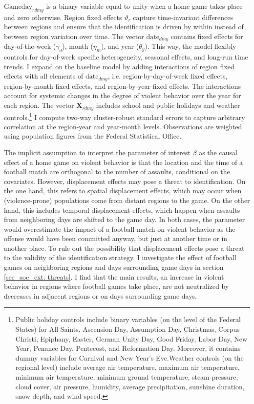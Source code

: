 $\text{Gameday}_{rdmy}$ is a binary variable equal to unity when a home game takes place and zero otherwise. Region fixed effects $\vartheta_r$ capture time-invariant differences between regions and ensure that the identification is driven by within instead of between region variation over time. The vector $\text{date}_{dmy}$ contains fixed effects for day-of-the-week ($\gamma_d$), month ($\eta_m$), and year ($\theta_y$). This way, the model flexibly controls for day-of-week specific heterogeneity, seasonal effects, and long-run time trends. I expand on the baseline model by adding interactions of region fixed effects with all elements of $\text{date}_{dmy}$, i.e. region-by-day-of-week fixed effects, region-by-month fixed effects, and region-by-year fixed effects. The interactions account for systemic changes in the degree of violent behavior over the year for each region. The vector $\mathbf{X}_{rdmy}$ includes school and public holidays and weather controls.\footnote{Public holiday controls include binary variables (on the level of the Federal States) for All Saints, Ascension Day, Assumption Day, Christmas, Corpus Christi, Epiphany, Easter, German Unity Day, Good Friday, Labor Day, New Year, Penance Day, Pentecost, and Reformation Day. Moreover, it contains dummy variables for Carnival and New Year's Eve.\newline Weather controls (on the regional level) include average air temperature, maximum air temperature, minimum air temperature, minimum ground temperature, steam pressure, cloud cover, air pressure, humidity, average precipitation, sunshine duration, snow depth, and wind speed.} I compute two-way cluster-robust standard errors to capture arbitrary correlation at the region-year and year-month levels. Observations are weighted using population figures from the Federal Statistical Office.


The implicit assumption to interpret the parameter of interest $\beta$ as the causal effect of a home game on violent behavior is that the location and the time of a football match are orthogonal to the number of assaults, conditional on the covariates. However, displacement effects may pose a threat to identification. On the one hand, this refers to spatial displacement effects, which may occur when (violence-prone) populations come from distant regions to the game. On the other hand, this includes temporal displacement effects, which happen when assaults from neighboring days are shifted to the game day. In both cases, the parameter would overestimate the impact of a football match on violent behavior as the offense would have been committed anyway, but just at another time or in another place. To rule out the possibility that displacement effects pose a threat to the validity of the identification strategy, I investigate the effect of football games on neighboring regions and days surrounding game days in section \ref{sec_soc_ext: threats}. I find that the main results, an increase in violent behavior in regions where football games take place, are not neutralized by decreases in adjacent regions or on days surrounding game days.


